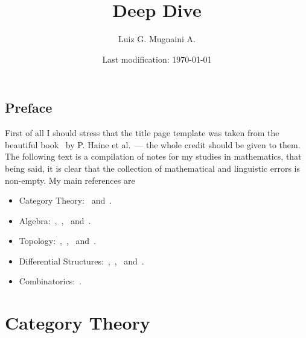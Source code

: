 

\newcommand{\onlyinsubfile}[1]{#1}
\newcommand{\notinsubfile}[1]{}

\author{Luiz G. Mugnaini A.}
\date{Last modification: \today}
\title{Deep Dive}



\renewcommand{\onlyinsubfile}[1]{}
\renewcommand{\notinsubfile}[1]{#1}

\frontmatter

% 
\maketitle

\tableofcontents
\listoftodos

\pagestyle{plain}

\chapter{Preface}

First of all I should stress that the title page template was taken from the
beautiful book~\cite{Haine21DiffCoho} by P. Haine et al.~--- the whole credit
should be given to them. The following text is a compilation of notes for my
studies in mathematics, that being said, it is clear that the collection of
mathematical and linguistic errors is non-empty. My main references are
\begin{itemize}\setlength\itemsep{0em}
\item Category Theory:~\cite{Rie16} and~\cite{Shap06}.
\item Algebra:~\cite{Yu89},~\cite{Kim20},~\cite{Aluf09} and~\cite{Lang93}.
\item Topology:~\cite{Lee11},~\cite{Tai20},~\cite{Mun00} and~\cite{Eng89}.
\item Differential Structures:~\cite{Zor15},~\cite{Zor16},~\cite{Rud76}
  and~\cite{Jost06}.
\item Combinatorics:~\cite{Die16}.
\end{itemize}

\mainmatter


\part{Category Theory}

